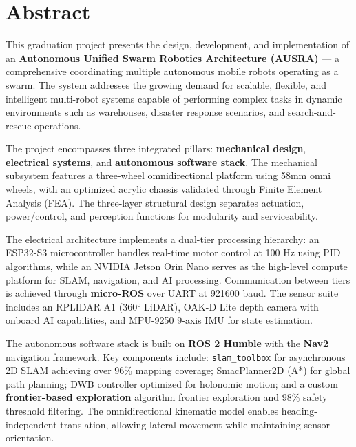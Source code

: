 
\chapter*{Abstract}

This graduation project presents the design, development, and implementation of an \textbf{Autonomous Unified Swarm Robotics Architecture (AUSRA)} --- a comprehensive coordinating multiple autonomous mobile robots operating as a swarm. The system addresses the growing demand for scalable, flexible, and intelligent multi-robot systems capable of performing complex tasks in dynamic environments such as warehouses, disaster response scenarios, and search-and-rescue operations.

The project encompasses three integrated pillars: \textbf{mechanical design}, \textbf{electrical systems}, and \textbf{autonomous software stack}. The mechanical subsystem features a three-wheel omnidirectional platform using 58mm omni wheels, with an optimized acrylic chassis validated through Finite Element Analysis (FEA). The three-layer structural design separates actuation, power/control, and perception functions for modularity and serviceability.

The electrical architecture implements a dual-tier processing hierarchy: an ESP32-S3 microcontroller handles real-time motor control at 100 Hz using PID algorithms, while an NVIDIA Jetson Orin Nano serves as the high-level compute platform for SLAM, navigation, and AI processing. Communication between tiers is achieved through \textbf{micro-ROS} over UART at 921600 baud. The sensor suite includes an RPLIDAR A1 (360° LiDAR), OAK-D Lite depth camera with onboard AI capabilities, and MPU-9250 9-axis IMU for state estimation.

The autonomous software stack is built on \textbf{ROS 2 Humble} with the \textbf{Nav2} navigation framework. Key components include: \texttt{slam\_toolbox} for asynchronous 2D SLAM achieving over 96\% mapping coverage; SmacPlanner2D (A*) for global path planning; DWB controller optimized for holonomic motion; and a custom \textbf{frontier-based exploration} algorithm frontier exploration and 98\% safety threshold filtering. The omnidirectional kinematic model enables heading-independent translation, allowing lateral movement while maintaining sensor orientation.

